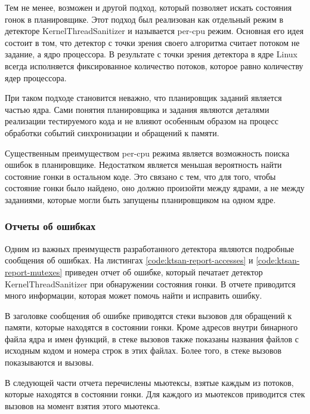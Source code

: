 Тем не менее, возможен и другой подход, который позволяет искать состояния гонок в планировщике.
Этот подход был реализован как отдельный режим в детекторе KernelThreadSanitizer и называется per-cpu режим.
Основная его идея состоит в том, что детектор с точки зрения своего алгоритма считает потоком не задание, а ядро процессора.
В результате с точки зрения детектора в ядре Linux всегда исполняется фиксированное количество потоков, которое равно количеству ядер процессора.

При таком подходе становится неважно, что планировщик заданий является частью ядра.
Сами понятия планировщика и задания являются деталями реализации тестируемого кода и не влияют особенным образом на процесс обработки событий синхронизации и обращений к памяти.

Существенным преимуществом per-cpu режима является возможность поиска ошибок в планировщике.
Недостатком является меньшая вероятность найти состояние гонки в остальном коде.
Это связано с тем, что для того, чтобы состояние гонки было найдено, оно должно произойти между ядрами, а не между заданиями, которые могли быть запущены планировщиком на одном ядре.


\subsubsection{Отчеты об ошибках}\label{sec:bug-reports}

Одним из важных преимуществ разработанного детектора являются подробные сообщения об ошибках.
На листингах \ref{code:ktsan-report-accesses} и \ref{code:ktsan-report-mutexes} приведен отчет об ошибке, который печатает детектор KernelThreadSanitizer при обнаружении состояния гонки.
В отчете приводится много информации, которая может помочь найти и исправить ошибку.

В заголовке сообщения об ошибке приводятся стеки вызовов для обращений к памяти, которые находятся в состоянии гонки.
Кроме адресов внутри бинарного файла ядра и имен функций, в стеке вызовов также показаны названия файлов с исходным кодом и номера строк в этих файлах.
Более того, в стеке вызовов показываются и  вызовы.

В следующей части отчета перечислены мьютексы, взятые каждым из потоков, которые находятся в состоянии гонки.
Для каждого из мьютексов приводится стек вызовов на момент взятия этого мьютекса.

